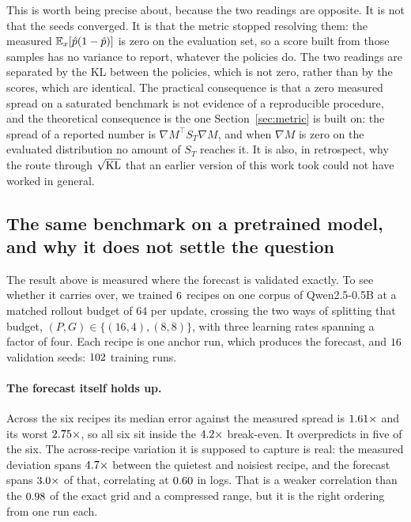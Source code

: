 This is worth being precise about, because the two readings are opposite. It is not that the seeds
converged. It is that the metric stopped resolving them: the measured $\mathbb{E}_x[\hat{p}(1-\hat{p})]$
is zero on the evaluation set, so a score built from those samples has no variance to report,
whatever the policies do. The two readings are separated by the KL between the policies, which is
not zero, rather than by the scores, which are identical. The
practical consequence is that a zero measured spread on a saturated benchmark is not evidence of a
reproducible procedure, and the theoretical consequence is the one
Section~\ref{sec:metric} is built on: the spread of a reported number is
$\nabla M^{\!\top} S_T \nabla M$, and when $\nabla M$ is zero on the evaluated distribution no amount
of $S_T$ reaches it. It is also, in retrospect, why the route through $\sqrt{\mathrm{KL}}$ that an earlier
version of this work took could not have worked in general.

\subsection{The same benchmark on a pretrained model, and why it does not settle the question}
\label{sec:exp-real-sizing}

The result above is measured where the forecast is validated exactly. To see whether it carries
over, we trained $6$ recipes on one corpus of Qwen2.5-0.5B at a matched rollout
budget of $64$ per update, crossing the two ways of splitting that budget, $(P, G) \in \{(16,4),
(8,8)\}$, with three learning rates spanning a factor of four. Each recipe is one anchor run, which
produces the forecast, and $16$ validation seeds: $102$ training runs.

\paragraph{The forecast itself holds up.} Across the six recipes its median error against the
measured spread is $1.61\times$ and its worst $2.75\times$, so all
six sit inside the $4.2\times$ break-even. It overpredicts in five of the six.
The across-recipe variation it is supposed to capture is real: the measured deviation spans
$4.7\times$ between the quietest and noisiest recipe, and the forecast spans
$3.0\times$ of that, correlating at $0.60$ in logs.
That is a weaker correlation than the $0.98$ of the exact grid and a
compressed range, but it is the right ordering from one run each.

